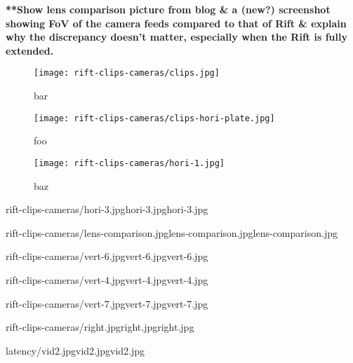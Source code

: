 \textbf{**Show lens comparison picture from blog \& a (new?) screenshot showing FoV of the camera feeds compared to that of Rift \& explain why the discrepancy doesn't matter, especially when the Rift is fully extended.}

\begin{figure}[!htb]
    \centering
    \begin{minipage}{.32\textwidth}
        \centering
        \texttt{[image: rift-clips-cameras/clips.jpg]}
        \caption{bar}
        \label{bar}
    \end{minipage}%
    \hspace{.01\textwidth}
    \begin{minipage}{0.32\textwidth}
        \centering
        \texttt{[image: rift-clips-cameras/clips-hori-plate.jpg]}
        \caption{foo}
        \label{foo}
    \end{minipage}%
    \hspace{.01\textwidth}
    \begin{minipage}{0.32\textwidth}
        \centering
        \texttt{[image: rift-clips-cameras/hori-1.jpg]}
        \caption{baz}
        \label{baz}
    \end{minipage}
\end{figure}

       {rift-clips-cameras/hori-3.jpg}{hori-3.jpg}{hori-3.jpg}

       {rift-clips-cameras/lens-comparison.jpg}{lens-comparison.jpg}{lens-comparison.jpg}

       {rift-clips-cameras/vert-6.jpg}{vert-6.jpg}{vert-6.jpg}

       {rift-clips-cameras/vert-4.jpg}{vert-4.jpg}{vert-4.jpg}

       {rift-clips-cameras/vert-7.jpg}{vert-7.jpg}{vert-7.jpg}

       {rift-clips-cameras/right.jpg}{right.jpg}{right.jpg}

       {latency/vid2.jpg}{vid2.jpg}{vid2.jpg}


